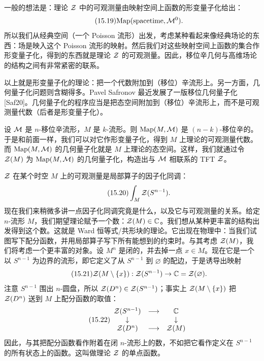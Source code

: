 一般的想法是：理论 $\mathcal{Z}$ 中的可观测量由映射空间上函数的形变量子化给出：
\begin{equation}\tag{15.19}
\mathrm{Map}(\text{spacetime},\mathcal{M}^0).
\end{equation}
所以我们从经典空间（一个 Poisson 流形）出发，考虑某种看起来像经典场论的东西：场是映入这个 Poisson 流形的映射。然后我们对这些映射空间上函数的集合作形变量子化，得到的东西就是理论 $\mathcal{Z}$ 的可观测量。因此，移位辛几何与高维场论的结构之间有非常紧密的联系。

以上就是形变量子化的理论：把一个代数附加到（移位）辛流形上。另一方面，几何量子化问题则含糊得多。Pavel Safronov 最近发展了一版移位几何量子化 [Saf20]。几何量子化的程序应当是把态空间附加到（移位）辛流形上，而不是可观测量代数（后者是形变量子化）。

设 $\mathcal{M}$ 是 $n$-移位辛流形，$M$ 是 $k$-流形。则 $\mathrm{Map}(M,\mathcal{M})$ 是 $(n-k)$-移位辛的。于是和前面一样，我们可以对它作形变量子化，得到 $M$ 上理论的可观测量代数。而 $\mathrm{Map}(M,\mathcal{M})$ 的几何量子化就是 $M$ 上理论的态空间。这样，我们就通过令 $\mathcal{Z}(M)$ 为 $\mathrm{Map}(M,\mathcal{M})$ 的几何量子化，构造出与 $\mathcal{M}$ 相联系的 TFT $\mathcal{Z}$。

$\mathcal{Z}$ 在某个时空 $M$ 上的可观测量是局部算子的因子化同调：
\begin{equation}\tag{15.20}
\int_M\mathcal{Z}(S^{n-1}).
\end{equation}
现在我们来稍微多讲一点因子化同调究竟是什么，以及它与可观测量的关系。给定 $n$-流形 $M$，我们期望理论赋予一个数：$\mathcal{Z}(M)\in\mathbb{C}$。我们想从某种更丰富的结构出发得到这个数。这就是 Ward 恒等式/共形块的理论。它出现在物理中：当我们试图写下配分函数，并用局部算子写下所有能想到的约束时。与其考虑 $\mathcal{Z}(M)$，我们将考虑一个更丰富的对象。设 $M^n$ 是闭的，并去掉一点 $x\in M$。现在它是一个以 $S^{n-1}$ 为边界的流形，即它定义了从 $S^{n-1}$ 到 $\varnothing$ 的配边，于是诱导出映射
\begin{equation}\tag{15.21}
\mathcal{Z}(M\setminus\{x\}):\mathcal{Z}(S^{n-1})\to\mathbb{C}=\mathcal{Z}(\varnothing).
\end{equation}
注意 $S^{n-1}$ 围出 $n$-圆盘，所以 $\mathcal{Z}(D^n)\in\mathcal{Z}(S^{n-1})$；事实上 $\mathcal{Z}(M\setminus\{x\})$ 把 $\mathcal{Z}(D^n)$ 送到 $M$ 上配分函数的取值：
\begin{equation}\tag{15.22}
\begin{array}{ccc}
\mathcal{Z}(S^{n-1}) & \longrightarrow & \mathbb{C}\\
\downarrow & & \downarrow\\
\mathcal{Z}(D^n) & \longrightarrow & \mathcal{Z}(M)
\end{array}
\end{equation}
因此，与其把配分函数看作附着在闭 $n$-流形上的数，不如把它看作定义在 $S^{n-1}$ 的所有状态上的函数。这叫做理论 $\mathcal{Z}$ 的单点函数。

